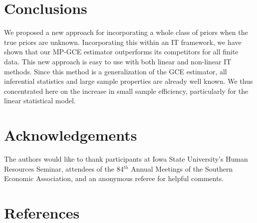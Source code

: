 \documentclass{elsarticle}
\begin{document}

\section{Conclusions}
\label{sec: conc}

We proposed a new approach for incorporating a whole class of priors when the true 
priors are unknown. 
Incorporating this within an IT framework, we have shown that our MP-GCE estimator 
outperforms its competitors for all finite data. 
This new approach is easy to use with both linear and non-linear IT methods. 
Since this method is a generalization of the GCE estimator, all inferential statistics and large 
sample properties are already well known. 
We thus concentrated here on the increase in small sample efficiency, particularly for the 
linear statistical model.


\section*{Acknowledgements }

The authors would like to thank participants at Iowa State University's Human Resources 
Seminar, attendees of the 84$^{th}$ Annual Meetings of the Southern Economic Association, 
and an anonymous referee for helpful comments.


\singlespacing

\section*{References}

\end{document}
